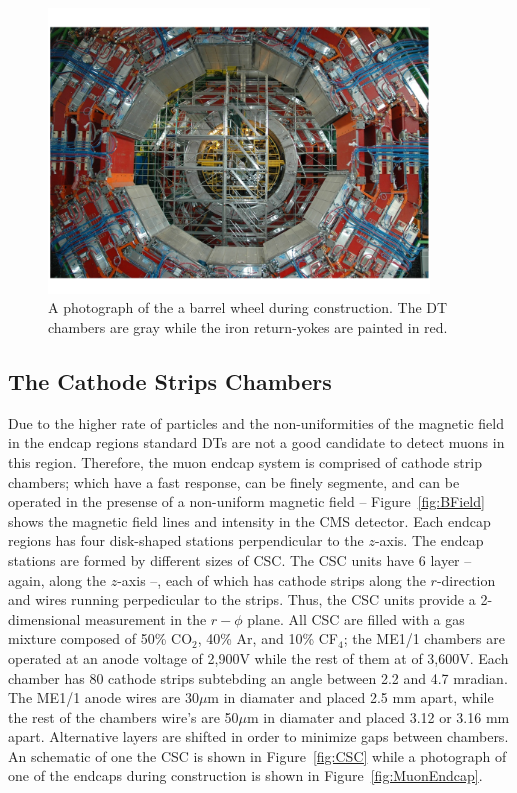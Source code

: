 \begin{figure}
 \centering
\includegraphics[width=0.9\textwidth]{CMS_DetectorFigures/MuonSystemBarrel.pdf}
\caption{A photograph of the a barrel wheel during construction. The
  DT chambers are gray while the 
  iron return-yokes are painted in red.\label{fig:MuonSystemLayout}}
\end{figure}
\subsection{The Cathode Strips Chambers}
Due to the higher rate of particles and the non-uniformities of the
magnetic field in the endcap regions standard DTs are not a good
candidate to detect muons in this region. Therefore, the muon endcap
system is comprised of cathode strip chambers; which have a fast
response, can be finely segmente, and can be operated in the presense
of a non-uniform magnetic field -- Figure~\ref{fig:BField} shows the
magnetic field lines and intensity in the CMS detector. Each endcap
regions has four disk-shaped stations perpendicular to the
$z$-axis. The endcap stations are formed by different sizes of
CSC. The CSC units have 6 layer -- again, along the $z$-axis --, each
of which has cathode strips along the $r$-direction and wires running
perpedicular to the strips. Thus, the CSC units provide a
2-dimensional measurement in the $r-\phi$ plane. All CSC are filled
with a gas mixture composed of 50\% CO$_{2}$, 40\% Ar, and 10\%
CF$_{4}$; the ME1/1 chambers are operated at an anode voltage of
2,900\unit{V} while the rest of them at of 3,600\unit{V}. Each chamber
has 80 cathode strips subtebding an angle between 2.2 and 4.7
mradian. The ME1/1 anode wires are 30$\mu$m in diamater and placed 2.5
mm apart, while the rest of the chambers wire's are 50$\mu$m in
diamater and placed 3.12 or 3.16
mm apart. Alternative layers are shifted in order to minimize gaps
between chambers. An schematic of one the CSC is shown in
Figure~\ref{fig:CSC} while a photograph of one of the endcaps during
construction is shown in Figure~\ref{fig:MuonEndcap}.

